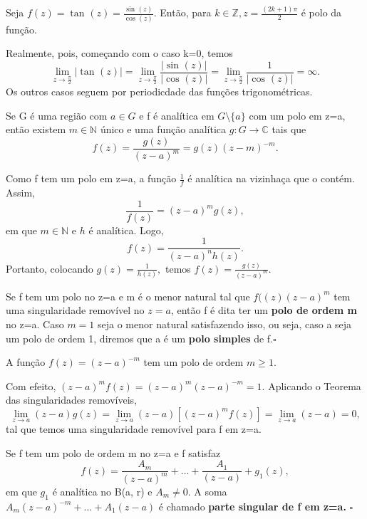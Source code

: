 \documentclass[complex.tex]{subfiles}
\begin{document}
\begin{example}
	Seja \(f(z) = \tan^{}{(z)} = \frac{\sin^{}{(z)}}{\cos^{}{(z)}}.\) Então, para \(k\in \mathbb{Z}, z = \frac{(2k+1)\pi }{2}\) é polo da função.

	Realmente, pois, começando com o caso k=0, temos
	\[
		\lim_{z\to \frac{\pi }{2}}|\tan^{}{(z)}| = \lim_{z\to \frac{\pi }{2}}\frac{|\sin^{}{(z)}|}{|\cos^{}{(z)}|} = \lim_{z\to \frac{\pi }{2}} \frac{1}{|\cos^{}{(z)}|} = \infty.
	\]
	Os outros casos seguem por periodicdade das funções trigonométricas.
\end{example}
\begin{prop*}
	Se G é uma região com \(a\in G\) e f é analítica em \(G\setminus{\{a\}}\) com um polo em z=a, então existem \(m\in \mathbb{N}\) único e uma função
	analítica \(g:G\rightarrow \mathbb{C}\) tais que
	\[
		f(z) = \frac{g(z)}{(z-a)^{m}} = g(z)(z-m)^{-m}.
	\]
\end{prop*}
\begin{proof*}
	Como f tem um polo em z=a, a função \(\frac{1}{f}\) é analítica na vizinhaça que o contém. Assim,
	\[
		\frac{1}{f(z)} = (z-a)^{m}g(z),
	\]
	em que \(m\in \mathbb{N}\) e \(h\) é analítica. Logo,
	\[
		f(z) = \frac{1}{(z-a)^{n}h(z)}.
	\]
	Portanto, colocando \(g(z) = \frac{1}{h(z)},\) temos \(f(z) = \frac{g(z)}{(z-a)^{m}}.\) \qedsymbol
\end{proof*}
\begin{def*}
	Se f tem um polo no z=a e m é o menor natural tal que \(f((z)(z-a)^{m}\) tem uma singularidade removível no \(z=a\), então f é dita ter
	um \textbf{polo de ordem m} no z=a. Caso \(m=1\) seja o menor natural satisfazendo isso, ou seja, caso a seja um polo de ordem 1, diremos que a é um \textbf{polo simples} de f.\(\square\)
\end{def*}
\begin{example}
	A função \(f(z) = (z-a)^{-m}\) tem um polo de ordem \(m\geq 1.\)

	Com efeito, \((z-a)^{m}f(z) = (z-a)^{m}(z-a)^{-m} = 1.\) Aplicando o Teorema das singularidades removíveis,
	\[
		\lim_{z\to a}(z-a)g(z)=\lim_{z\to a}(z-a)[(z-a)^{m}f(z)] = \lim_{z\to a}(z-a)=0,
	\]
	tal que temos uma singularidade removível para f em z=a.
\end{example}
\begin{def*}
	Se f tem um polo de ordem m no z=a e f satisfaz
	\[
		f(z) = \frac{A_{m}}{(z-a)^{m}}+\dotsc +\frac{A_{1}}{(z-a)} + g_{1}(z),
	\]
	em que \(g_{1}\) é analítica no B(a, r) e \(A_{m}\neq0\). A soma \(A_{m}(z-a)^{-m}+\dotsc +A_{1}(z-a)\) é chamado
	\textbf{parte singular de f em z=a.} \(\square\)
\end{def*}
\end{document}
